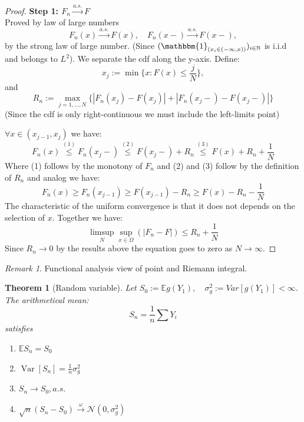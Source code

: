 \documentclass[a4paper,12pt, oneside, fleqn]{book}
\newtheorem{theorem}{Theorem}[section]
\theoremstyle{definition}
\theoremstyle{remark}
\newtheorem*{remark}{Remark}
\DeclareMathOperator{\var}{Var}
\begin{document}
\begin{proof}
\textbf{Step 1: $F_n \overset{a.s.}{\rightarrow} F$}\\
Proved by law of large numbers
\begin{equation*}
	F_n(x) \overset{a.s.}{\longrightarrow} F(x), \quad F_n(x-) \overset{a.s.}{\longrightarrow} F(x-), 
\end{equation*}
by the strong law of large number. (Since $(\mathbbm{1}_{(x_i \in (- \infty, x))})_{i \in \mathbb{N}}$ is i.i.d and belongs to $L^2$). We separate the cdf along the y-axis. Define:
\begin{equation*}
	x_j := \min \{x : F(x) \leq \frac{j}{N}\}, 
\end{equation*}
and
\begin{equation*}
	R_n := \max_{j = 1, \dots, N}\{ |F_n(x_j) - F(x_j)| + |F_n(x_j-) - F(x_j-)| \}
\end{equation*}
(Since the cdf is only right-continuous we must include the left-limits point)

$\forall x \in (x_{j - 1}, x_j)$ we have:
\begin{equation*}
	F_n(x) \overset{(1)}{\leq} F_n(x_{j}-) \overset{(2)}{\leq} F(x_j-) + R_n \overset{(3)}{\leq} F(x) + R_n + \frac{1}{N} 
\end{equation*}
Where (1) follows by the monotony of $F_n$ and (2) and (3) follow by the definition of $R_n$ and analog we have:
\begin{equation*}
	F_n(x) \geq F_n (x_{j -1}) \geq F(x_{j - 1}) - R_n \geq F(x) - R_n - \frac{1}{N}
\end{equation*}
The characteristic of the uniform convergence is that it does not depends on the selection of $x$. 
Together we have:
\begin{equation*}
	\limsup_N \sup_{x \in \Omega}(|F_n - F|) \leq R_n + \frac{1}{N}
\end{equation*}
Since $R_n \longrightarrow 0$ by the results above the equation goes to zero as $N \longrightarrow \infty$.
\end{proof}

\begin{remark}
Functional analysis view of point and Riemann integral. 	
\end{remark}


\begin{theorem}[Random variable]
Let $S_0 := \mathbb{E} g(Y_1), \quad \sigma_g^2:= Var[ g(Y_1) ] < \infty $. The arithmetical mean:
\begin{equation*}
	S_n = \frac{1}{n} \sum Y_i
\end{equation*}
satisfies
\begin{enumerate}
	\item $\mathbb{E} S_n = S_0$
	\item $\var[S_n] = \frac{1}{n} \sigma_g^2$
	\item $S_n \longrightarrow S_0, a.s.$
	\item $\sqrt{n} (S_n - S_0) \overset{\omega}{\longrightarrow} \mathcal{N}(0, \sigma^2_g)$
\end{enumerate}
\end{theorem}
\end{document}
